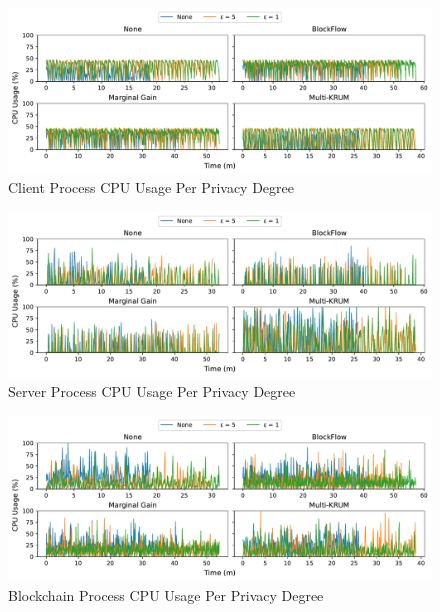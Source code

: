 \clearpage

\begin{figure}[!h]
    \centering
    \includegraphics[width=\textwidth]{graphics/privacy/cpu_client.pdf}
    \caption{Client Process CPU Usage Per Privacy Degree}
    \label{fig:cpu_privacy_clients}
\end{figure}

\vfill

\begin{figure}[!h]
    \centering
    \includegraphics[width=\textwidth]{graphics/privacy/cpu_server.pdf}
    \caption{Server Process CPU Usage Per Privacy Degree}
    \label{fig:cpu_privacy_servers}
\end{figure}

\vfill

\begin{figure}[!h]
    \centering
    \includegraphics[width=\textwidth]{graphics/privacy/cpu_miner.pdf}
    \caption{Blockchain Process CPU Usage Per Privacy Degree}
    \label{fig:cpu_privacy_miners}
\end{figure}
